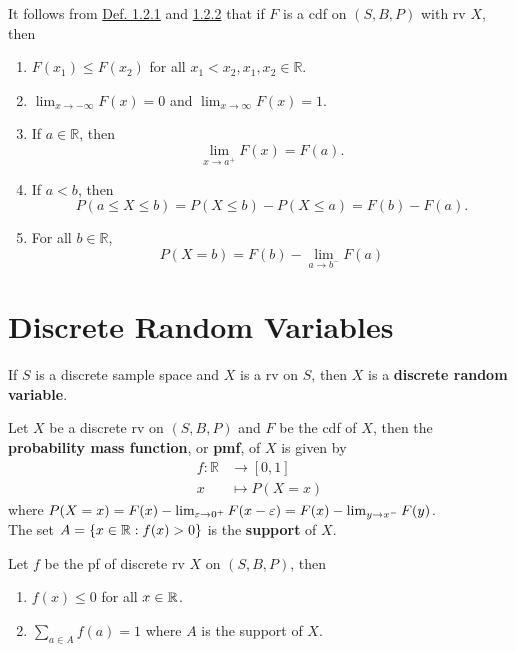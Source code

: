 \documentclass[11pt,fleqn]{book} %
\begin{document}
\begin{remark} It follows from \hyperref[def:121]{Def. 1.2.1} and \hyperref[def:122]{1.2.2} that if \(F\) is a cdf on \((S, B, P)\) with rv \(X\), then
\begin{enumerate}
\item \(F(x_1) \leq F(x_2)\) for all \(x_1 < x_2, x_1, x_2 \in \mathbb{R}\).
\item \(\lim_{x\rightarrow -\infty} F(x) = 0\) and \(\lim_{x\rightarrow\infty} F(x) = 1\).
\item If \(a \in \mathbb{R}\), then
\[
\lim_{x\rightarrow a^+}F(x) = F(a).
\]
\item If \(a < b\), then
\[
P(a \leq X \leq b) = P(X \leq b) - P(X \leq a) = F(b) - F(a).
\]
\item For all \(b \in \mathbb{R}\),
\[
P(X = b) = F(b) - \lim_{a\rightarrow b^-} F(a)
\]
\end{enumerate}
\end{remark}


\section{Discrete Random Variables}

\begin{definition} \label{def:121}
If \(S\) is a discrete sample space and \(X\) is a rv on \(S\), then \(X\) is a \textbf{discrete random variable}.
\end{definition}

\begin{definition} \label{def:122}
Let \(X\) be a discrete rv on \((S, B, P)\) and \(F\) be the cdf of \(X\), then the \textbf{probability mass function}, or \textbf{pmf}, of \(X\) is given by
\[
\begin{aligned}
f: \mathbb{R} &\rightarrow [0, 1] \\
x &\mapsto P(X = x)
\end{aligned}
\]
where \(P(X = x) = F(x) - \lim_{\varepsilon\rightarrow 0^+} F(x - \varepsilon) = F(x) - \lim_{y\rightarrow x^-} F(y)\).\\
The set \(A = \{x \in \mathbb{R}: f(x) > 0\}\) is the \textbf{support} of \(X\).
\end{definition}

\begin{remark} Let \(f\) be the pf of discrete rv \(X\) on \((S, B, P)\), then
\begin{enumerate}
\item \(f(x) \leq 0\) for all \(x \in \mathbb{R}\).
\item \(\sum_{a \in A} f(a) = 1\) where \(A\) is the support of \(X\).
\end{enumerate}
\end{remark}
\end{document}

